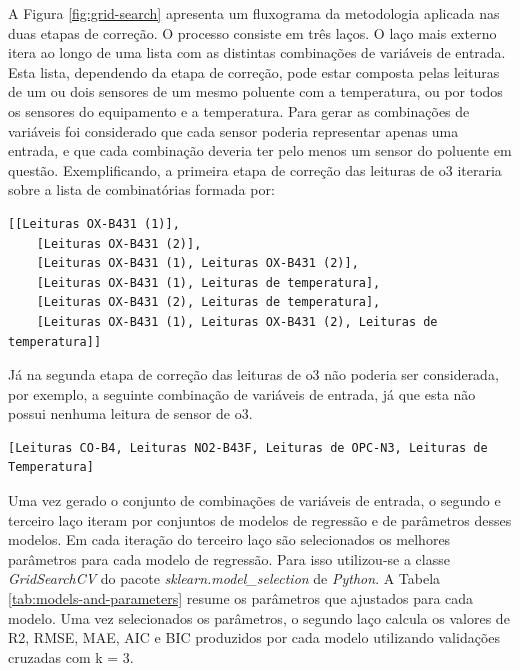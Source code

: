A Figura \ref{fig:grid-search} apresenta um fluxograma da metodologia aplicada nas duas etapas de correção. O processo consiste em três laços. O laço mais externo itera ao longo de uma lista com as distintas combinações de variáveis de entrada. Esta lista, dependendo da etapa de correção, pode estar composta pelas leituras de um ou dois sensores de um mesmo poluente com a temperatura, ou por todos os sensores do equipamento e a temperatura. Para gerar as combinações de variáveis foi considerado que cada sensor poderia representar apenas uma entrada, e que cada combinação deveria ter pelo menos um sensor do poluente em questão. Exemplificando, a primeira etapa de correção das leituras de \acrshort{o3} iteraria sobre a lista de combinatórias formada por: 

\begin{lstlisting}[basicstyle=\tiny]
    [[Leituras OX-B431 (1)], 
    [Leituras OX-B431 (2)], 
    [Leituras OX-B431 (1), Leituras OX-B431 (2)],
    [Leituras OX-B431 (1), Leituras de temperatura],
    [Leituras OX-B431 (2), Leituras de temperatura],
    [Leituras OX-B431 (1), Leituras OX-B431 (2), Leituras de temperatura]] 
\end{lstlisting}

Já na segunda etapa de correção das leituras de \acrshort{o3} não poderia ser considerada, por exemplo, a seguinte combinação de variáveis de entrada, já que esta não possui nenhuma leitura de sensor de \acrshort{o3}.

\begin{lstlisting}[basicstyle=\tiny]
    [Leituras CO-B4, Leituras NO2-B43F, Leituras de OPC-N3, Leituras de Temperatura]
\end{lstlisting}

Uma vez gerado o conjunto de combinações de variáveis de entrada, o segundo e terceiro laço iteram por conjuntos de modelos de regressão e de parâmetros desses modelos. Em cada iteração do terceiro laço são selecionados os melhores parâmetros para cada modelo de regressão. Para isso utilizou-se a classe \textit{GridSearchCV} do pacote \textit{sklearn.model\_selection} de \textit{Python}. A Tabela \ref{tab:models-and-parameters} resume os parâmetros que ajustados para cada modelo. Uma vez selecionados os parâmetros, o segundo laço calcula os valores de R2, RMSE, MAE, AIC e BIC produzidos por cada modelo utilizando validações cruzadas com k = 3.

